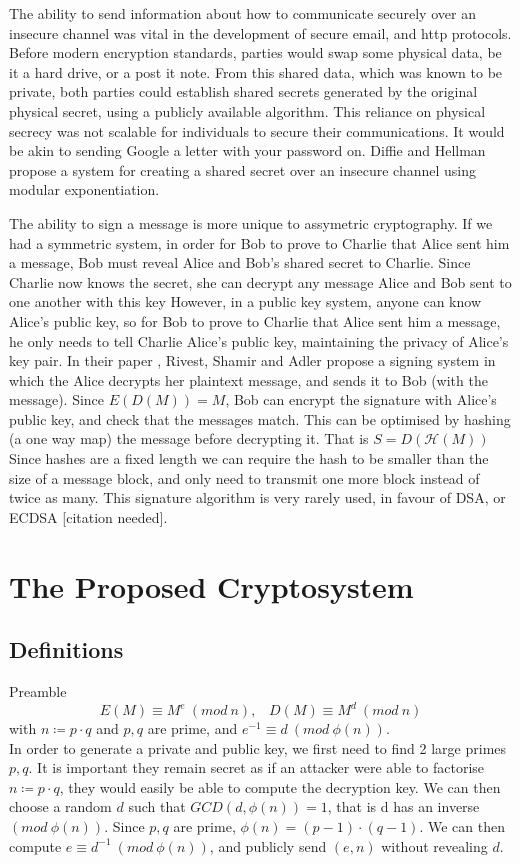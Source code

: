 \documentclass{article}
\begin{document}
The ability to send information about how to communicate securely over an insecure channel was vital in the development of secure email, and http protocols.
Before modern encryption standards, parties would swap some physical data, be it a hard drive, or a post it note.
From this shared data, which was known to be private,
both parties could establish shared secrets generated by the original physical secret,
using a publicly available algorithm.
This reliance on physical secrecy was not scalable for individuals to secure their communications.
It would be akin to sending Google a letter with your password on.
Diffie and Hellman \cite{Directions} propose a system for creating a shared secret over an insecure channel using modular exponentiation.

The ability to sign a message is more unique to assymetric cryptography.
If we had a symmetric system, in order for Bob to prove to Charlie that Alice sent him a message,
Bob must reveal Alice and Bob's shared secret to Charlie.
Since Charlie now knows the secret, she can decrypt any message Alice and Bob sent to one another with this key
However, in a public key system, anyone can know Alice's public key, so for Bob to prove to Charlie that Alice sent him a message,
he only needs to tell Charlie Alice's public key, maintaining the privacy of Alice's key pair.
In their paper \cite{RSA}, Rivest, Shamir and Adler propose a signing system
in which the Alice decrypts her plaintext message, and sends it to Bob (with the message).
Since $E(D(M)) = M$, Bob can encrypt the signature with Alice's public key, and check that the messages match.
This can be optimised by hashing (a one way map) the message before decrypting it. That is $S = D(\mathcal{H}(M))$
Since hashes are a fixed length we can require the hash to be smaller than the size of a message block,
and only need to transmit one more block instead of twice as many.
This signature algorithm is very rarely used, in favour of DSA, or ECDSA [citation needed].
\newpage
\section{The Proposed Cryptosystem}
\subsection{Definitions}
Preamble
\[ E(M) \equiv M^e \: (mod \: n),\;\;\; D(M) \equiv M^d \: (mod \: n)\]
with $ n \coloneqq p \cdot q $ and $p, q$ are prime, and $e^{-1} \equiv d \: (mod \: \phi (n))$. \\
In order to generate a private and public key, we first need to find 2 large primes $p, q$.
It is important they remain secret as if an attacker were able to factorise
$ n \coloneqq p \cdot q $,
they would easily be able to compute the decryption key. We can then choose a random $d$ such that $GCD(d, \phi (n)) = 1$,
that is d has an inverse $(mod \: \phi(n))$.
Since $p, q$ are prime, $\phi(n) = (p-1) \cdot (q-1) $.
We can then compute $e \equiv d^{-1} \: (mod \: \phi(n))$,
and publicly send $(e, n)$ without revealing $d$.
\end{document}
